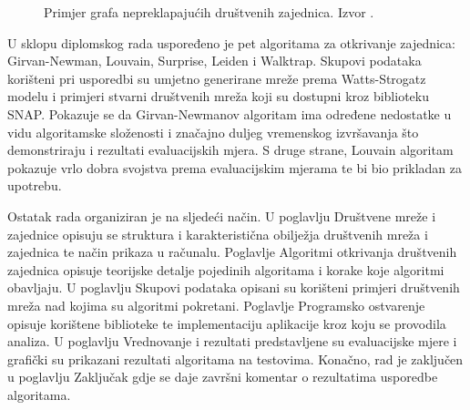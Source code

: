 \begin{figure}
	\caption{Primjer grafa nepreklapajućih društvenih zajednica. Izvor \cite{jayawickrama_2021}.}
	\label{fig:comm1}
\end{figure}


U sklopu diplomskog rada uspoređeno je pet algoritama za otkrivanje zajednica: Girvan-Newman, Louvain, Surprise, Leiden i Walktrap. Skupovi podataka korišteni pri usporedbi su umjetno generirane mreže prema Watts-Strogatz modelu i  primjeri stvarni društvenih mreža koji su dostupni kroz biblioteku SNAP. Pokazuje se da Girvan-Newmanov algoritam ima određene nedostatke u vidu algoritamske složenosti i značajno duljeg vremenskog izvršavanja što demonstriraju i rezultati evaluacijskih mjera. S druge strane, Louvain algoritam pokazuje vrlo dobra svojstva prema evaluacijskim mjerama te bi bio prikladan za upotrebu.

Ostatak rada organiziran je na sljedeći način. U poglavlju Društvene mreže i zajednice opisuju se struktura i karakteristična obilježja društvenih mreža i zajednica te način prikaza u računalu. Poglavlje Algoritmi otkrivanja društvenih zajednica opisuje teorijske detalje pojedinih algoritama i korake koje algoritmi obavljaju. U poglavlju Skupovi podataka opisani su korišteni primjeri društvenih mreža nad kojima su algoritmi pokretani. Poglavlje Programsko ostvarenje opisuje korištene biblioteke te implementaciju aplikacije kroz koju se provodila analiza. U poglavlju Vrednovanje i rezultati predstavljene su evaluacijske mjere i grafički su prikazani rezultati algoritama na testovima. Konačno, rad je zaključen u poglavlju Zaključak gdje se daje završni komentar o rezultatima usporedbe algoritama.

